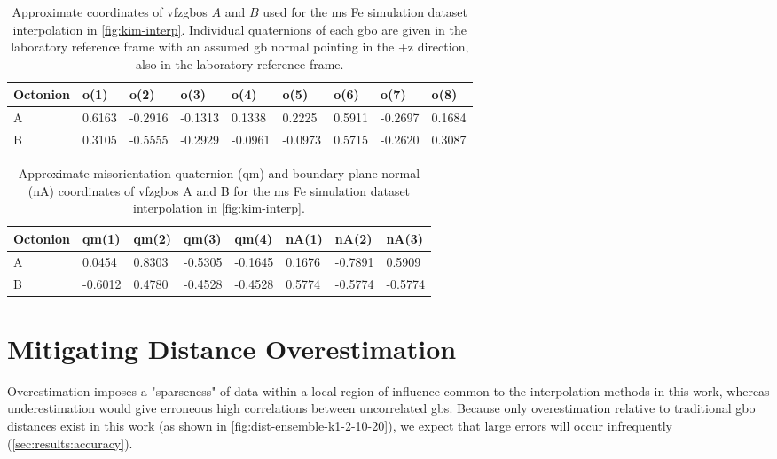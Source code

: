 \documentclass[preprint,12pt]{elsarticle}
\begin{document}
\begin{table}
\centering
\caption{Approximate coordinates of \glspl{vfzgbo} $A$ and $B$ used for the \gls{ms} Fe simulation dataset interpolation in \cref{fig:kim-interp}. Individual quaternions of each \gls{gbo} are given in the laboratory reference frame with an assumed \gls{gb} normal pointing in the +z direction, also in the laboratory reference frame.}
\label{tab:tunnel-AB2}
\begin{tabular}{lllllllll}
\hline
Octonion & o(1)   & o(2)    & o(3)    & o(4)    & o(5)    & o(6)   & o(7)    & o(8)   \\ \hline
A        & 0.6163 & -0.2916 & -0.1313 & 0.1338 & 0.2225 & 0.5911 & -0.2697 & 0.1684 \\
B        & 0.3105 & -0.5555 & -0.2929 & -0.0961 & -0.0973 & 0.5715 & -0.2620 & 0.3087 \\ \hline
\end{tabular}
\end{table}

\begin{table}[]
\centering
\caption{Approximate misorientation quaternion (qm) and boundary plane normal (nA) coordinates of \glspl{vfzgbo} A and B for the \gls{ms} Fe simulation dataset interpolation in \cref{fig:kim-interp}. }
\label{tab:tunnel-AB2-qm-nA}
\begin{tabular}{@{}llllllll@{}}
\toprule
Octonion & qm(1) & qm(2) & qm(3) & qm(4) & nA(1) & nA(2) & nA(3) \\ \midrule
A & 0.0454 & 0.8303 & -0.5305 & -0.1645 & 0.1676 & -0.7891 & 0.5909 \\
B & -0.6012 & 0.4780 & -0.4528 & -0.4528 & 0.5774 & -0.5774 & -0.5774 \\ \bottomrule
\end{tabular}
\end{table}

%
\section{Mitigating Distance Overestimation} \label{sec:overestimation}
Overestimation imposes a "sparseness" of data within a local region of influence common to the interpolation methods in this work, whereas underestimation would give erroneous high correlations between uncorrelated \glspl{gb}. Because only overestimation relative to traditional \gls{gbo} distances exist in this work (as shown in \cref{fig:dist-ensemble-k1-2-10-20}), we expect that large errors will occur infrequently (\cref{sec:results:accuracy}). 
\end{document}
